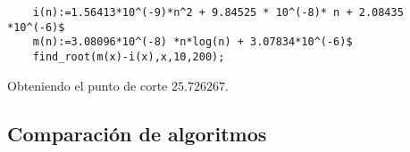 \begin{lstlisting}
	i(n):=1.56413*10^(-9)*n^2 + 9.84525 * 10^(-8)* n + 2.08435 *10^(-6)$
	m(n):=3.08096*10^(-8) *n*log(n) + 3.07834*10^(-6)$
	find_root(m(x)-i(x),x,10,200);
\end{lstlisting}

Obteniendo el punto de corte $25.726267$.



\subsection{Comparación de algoritmos}
